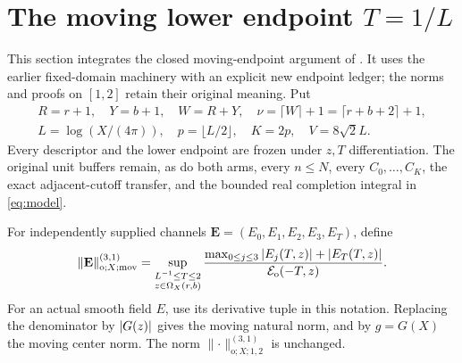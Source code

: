 \section{The moving lower endpoint \texorpdfstring{$T=1/L$}{T=1/L}}
\label{sec:moving-endpoint}
This section integrates the closed moving-endpoint argument of
\cite{rec20,rec20review}. It uses the earlier fixed-domain machinery
with an explicit new endpoint ledger; the norms and proofs on
\([1,2]\) retain their original meaning. Put
\begin{equation}
 \begin{gathered}
 R=r+1,\quad Y=b+1,\quad W=R+Y,\quad
 \nu=\lceil W\rceil+1=\lceil r+b+2\rceil+1,\\
 L=\log(X/(4\pi)),\quad p=\lfloor L/2\rfloor,\quad
 K=2p,\quad V=8\sqrt2L.
 \end{gathered}
 \label{eq:moving-data}
\end{equation}
Every descriptor and the lower endpoint are frozen under \(z,T\)
differentiation. The original unit buffers remain, as do both arms,
every \(n\le N\), every \(C_0,\ldots,C_K\), the exact adjacent-cutoff
transfer, and the bounded real completion integral in \eqref{eq:model}.

\begin{definition}
\label{def:moving-channel-norm}
For independently supplied channels
\(\mathbf E=(E_0,E_1,E_2,E_3,E_T)\), define
\begin{equation}
 \lVert\mathbf E\rVert_{\mathrm o;X;\mathrm{mov}}^{(3,1)}
 =\sup_{\substack{L^{-1}\le T\le2\\z\in\Omega_X(r,b)}}
 \frac{\max_{0\le j\le3}|E_j(T,z)|+|E_T(T,z)|}
      {\mathcal E_{\mathrm o}(-T,z)}.
 \label{eq:moving-norm}
\end{equation}
For an actual smooth field \(E\), use its derivative tuple in this
notation. Replacing the denominator by \(\lvert G(z)\rvert\) gives the
moving natural norm, and by \(g=G(X)\) the moving center norm.
The norm \(\lVert\cdot\rVert_{\mathrm o;X;1,2}^{(3,1)}\) is unchanged.
\end{definition}

